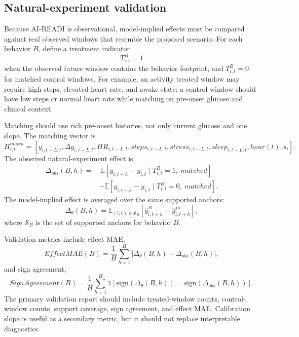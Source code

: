 \subsection{Natural-experiment validation}
\label{subsec:natural_experiment_validation}

Because AI-READI is observational, model-implied effects must be compared against real observed windows that resemble the proposed scenario. For each behavior $B$, define a treatment indicator
\begin{equation}
    T^B_{i,t} = 1
\end{equation}
when the observed future window contains the behavior footprint, and $T^B_{i,t}=0$ for matched control windows. For example, an activity treated window may require high steps, elevated heart rate, and awake state; a control window should have low steps or normal heart rate while matching on pre-onset glucose and clinical context.

Matching should use rich pre-onset histories, not only current glucose and one slope. The matching vector is
\begin{equation}
    H^{match}_{i,t}=
    \left[y_{i,t-L:t},\Delta y_{i,t-L:t},HR_{i,t-L:t},steps_{i,t-L:t},stress_{i,t-L:t},sleep_{i,t-L:t},hour(t),s_i\right].
\end{equation}
The observed natural-experiment effect is
\begin{align}
    \Delta_{obs}(B,h)
    =
    &\ \mathbb{E}\left[y_{i,t+h}-y_{i,t}\mid T^B_{i,t}=1,\ matched\right]
    \\
    &-\mathbb{E}\left[y_{i,t+h}-y_{i,t}\mid T^B_{i,t}=0,\ matched\right].
    \label{eq:observed_effect}
\end{align}
The model-implied effect is averaged over the same supported anchors:
\begin{equation}
    \Delta_\theta(B,h)
    = \mathbb{E}_{(i,t)\in\mathcal{S}_B}
    \left[\hat{y}^{B}_{i,t+h}-\hat{y}^{fo}_{i,t+h}\right],
    \label{eq:average_model_effect}
\end{equation}
where $\mathcal{S}_B$ is the set of supported anchors for behavior $B$.

Validation metrics include effect MAE,
\begin{equation}
    EffectMAE(B)
    = \frac{1}{H}\sum_{h=1}^{H}
    \left|\Delta_\theta(B,h)-\Delta_{obs}(B,h)\right|,
\end{equation}
and sign agreement,
\begin{equation}
    SignAgreement(B)
    = \frac{1}{H}\sum_{h=1}^{H}
    \mathbb{1}\left[\mathrm{sign}(\Delta_\theta(B,h))=\mathrm{sign}(\Delta_{obs}(B,h))\right].
\end{equation}
The primary validation report should include treated-window counts, control-window counts, support coverage, sign agreement, and effect MAE. Calibration slope is useful as a secondary metric, but it should not replace interpretable diagnostics.

